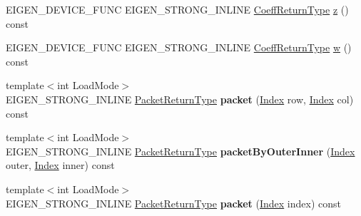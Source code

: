 \begin{DoxyCompactItemize}
\item 
E\+I\+G\+E\+N\+\_\+\+D\+E\+V\+I\+C\+E\+\_\+\+F\+U\+NC E\+I\+G\+E\+N\+\_\+\+S\+T\+R\+O\+N\+G\+\_\+\+I\+N\+L\+I\+NE \mbox{\hyperlink{struct_eigen_1_1internal_1_1true__type}{Coeff\+Return\+Type}} \mbox{\hyperlink{class_eigen_1_1_dense_coeffs_base_3_01_derived_00_01_read_only_accessors_01_4_a9040af2dcad8961168daafe09c1b1dc4}{z}} () const
\item 
E\+I\+G\+E\+N\+\_\+\+D\+E\+V\+I\+C\+E\+\_\+\+F\+U\+NC E\+I\+G\+E\+N\+\_\+\+S\+T\+R\+O\+N\+G\+\_\+\+I\+N\+L\+I\+NE \mbox{\hyperlink{struct_eigen_1_1internal_1_1true__type}{Coeff\+Return\+Type}} \mbox{\hyperlink{class_eigen_1_1_dense_coeffs_base_3_01_derived_00_01_read_only_accessors_01_4_a422892fbb6b2eecce243776c3b8452ab}{w}} () const
\item 
\mbox{\label{class_eigen_1_1_dense_coeffs_base_3_01_derived_00_01_read_only_accessors_01_4_a9f1f55e50671fba111f4c21688b252f2}} 
{\footnotesize template$<$int Load\+Mode$>$ }\\E\+I\+G\+E\+N\+\_\+\+S\+T\+R\+O\+N\+G\+\_\+\+I\+N\+L\+I\+NE \mbox{\hyperlink{struct_eigen_1_1internal_1_1true__type}{Packet\+Return\+Type}} {\bfseries packet} (\mbox{\hyperlink{struct_eigen_1_1_eigen_base_a554f30542cc2316add4b1ea0a492ff02}{Index}} row, \mbox{\hyperlink{struct_eigen_1_1_eigen_base_a554f30542cc2316add4b1ea0a492ff02}{Index}} col) const
\item 
\mbox{\label{class_eigen_1_1_dense_coeffs_base_3_01_derived_00_01_read_only_accessors_01_4_a91eb68efc00646608415e7ac9df5310e}} 
{\footnotesize template$<$int Load\+Mode$>$ }\\E\+I\+G\+E\+N\+\_\+\+S\+T\+R\+O\+N\+G\+\_\+\+I\+N\+L\+I\+NE \mbox{\hyperlink{struct_eigen_1_1internal_1_1true__type}{Packet\+Return\+Type}} {\bfseries packet\+By\+Outer\+Inner} (\mbox{\hyperlink{struct_eigen_1_1_eigen_base_a554f30542cc2316add4b1ea0a492ff02}{Index}} outer, \mbox{\hyperlink{struct_eigen_1_1_eigen_base_a554f30542cc2316add4b1ea0a492ff02}{Index}} inner) const
\item 
\mbox{\label{class_eigen_1_1_dense_coeffs_base_3_01_derived_00_01_read_only_accessors_01_4_a59cdfd584816b409afd021aafed30606}} 
{\footnotesize template$<$int Load\+Mode$>$ }\\E\+I\+G\+E\+N\+\_\+\+S\+T\+R\+O\+N\+G\+\_\+\+I\+N\+L\+I\+NE \mbox{\hyperlink{struct_eigen_1_1internal_1_1true__type}{Packet\+Return\+Type}} {\bfseries packet} (\mbox{\hyperlink{struct_eigen_1_1_eigen_base_a554f30542cc2316add4b1ea0a492ff02}{Index}} index) const

\end{DoxyCompactItemize}
